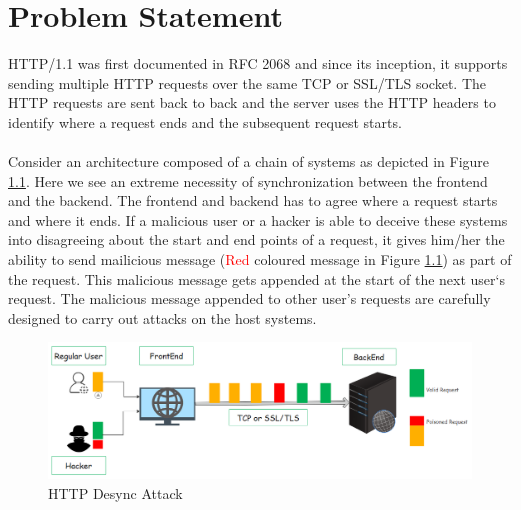 \chapter{Problem Statement}
HTTP/1.1 was first documented in RFC 2068 \cite{b9} and since its inception, it supports sending multiple HTTP requests over the same TCP or SSL/TLS socket. The HTTP requests are sent back to back and the server uses the HTTP headers to identify where a request ends and the subsequent request starts. \\\\
Consider an architecture composed of a chain of systems as depicted in Figure \ref{fig:HTTP Desync Attack}. Here we see an extreme necessity of synchronization between the frontend and the backend. The frontend and backend has to agree where a request starts and where it ends. If a malicious user or a hacker is able to deceive these systems into disagreeing about the start and end points of a request, it gives him/her the ability to send mailicious message (\textcolor{red}{Red} coloured message in Figure \ref{fig:HTTP Desync Attack}) as part of the request. This malicious message gets appended at the start of the next user`s request. The malicious message appended to other user's requests are carefully designed to carry out attacks on the host systems. 

\begin{figure}
	\includegraphics[width=14cm]{images/HTTP_Desync}
	\caption{HTTP Desync Attack}
	\label{fig:HTTP Desync Attack}
\end{figure}


